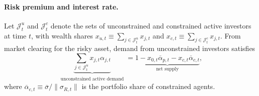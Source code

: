 


\paragraph{Risk premium and interest rate.} 

Let $\mathcal{J}_t^u$ and $\mathcal{J}_t^c$ denote the sets of unconstrained and constrained active investors at time $t$, with wealth shares $x_{u,t} \equiv \sum_{j\in \mathcal{J}_t^u} x_{j,t}$ and $x_{c,t} \equiv \sum_{j\in \mathcal{J}_t^c} x_{j,t}$. From market clearing for the risky asset, demand from unconstrained investors satisfies
\begin{equation}\label{eq:mkt-clearing}
    \underbrace{\sum_{j \in \mathcal{J}_t^u} x_{j,t} \alpha_{j,t} }_{\substack{\text{unconstrained active demand}}} = \underbrace{1 - x_{0,t} \overline{\alpha}_{p,t} - x_{c,t} \overline{\alpha}_{c,t} }_{\text{net supply}},
\end{equation}
where $\overline{\alpha}_{c,t} \equiv \overline{\sigma}/\|\sigma_{R,t}\|$ is the portfolio share of constrained agents.

